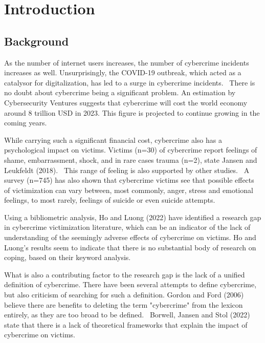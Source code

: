 \section{Introduction}

\subsection*{Background}

As the number of internet users increases, the number of cybercrime incidents increases as well. Unsurprisingly, the COVID-19 outbreak, which acted as a catalysor for digitalization, has led to a surge in cybercrime incidents.~\citep{Monteith2021Increasing} There is no doubt about cybercrime being a significant problem. An estimation by Cybersecurity Ventures suggests that cybercrime will cost the world economy around 8 trillion USD in 2023. This figure is projected to continue growing in the coming years.~\citep{cybersecurity-ventures-cybercrime-report}

While carrying such a significant financial cost, cybercrime also has a psychological impact on victims. Victims (n=30) of cybercrime report feelings of shame, embarrassment, shock, and in rare cases trauma (n=2), state Jansen and Leukfeldt (2018).~\citep{jansen2018coping} This range of feeling is also supported by other studies.~\cite{reynolds2022everyone} A survey (n=745) has also shown that cybercrime victims see that possible effects of victimization can vary between, most commonly, anger, stress and emotional feelings, to most rarely, feelings of suicide or even suicide attempts.~\cite{button2014not}

Using a bibliometric analysis, Ho and Luong (2022) have identified a research gap in cybercrime victimization literature, which can be an indicator of the lack of understanding of the seemingly adverse effects of cybercrime on victims. Ho and Luong's results seem to indicate that there is no substantial body of research on coping, based on their keyword analysis.~\citep{horesearch}

What is also a contributing factor to the research gap is the lack of a unified definition of cybercrime. There have been several attempts to define cybercrime, but also criticism of searching for such a definition. Gordon and Ford (2006) believe there are benefits to deleting the term "cybercrime" from the lexicon entirely, as they are too broad to be defined.~\citep{gordon2006definition} Borwell, Jansen and Stol (2022) state that there is a lack of theoretical frameworks that explain the impact of cybercrime on victims.~\citep{borwell2022psychological}

